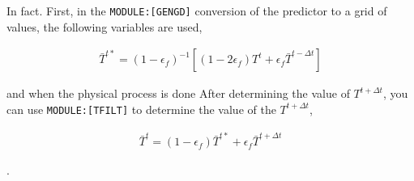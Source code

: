 In fact. First, in the \texttt{MODULE:{[}GENGD{]}} conversion of the
predictor to a grid of values, the following variables are used,

\begin{eqnarray}
  \bar{T}^{t*}
    = ( 1 -\epsilon_f )^{-1}
     \left[ ( 1-2 \epsilon_f ) T^{t} + \epsilon_f \bar{T}^{t-\Delta t}
     \right]
\end{eqnarray}

and when the physical process is done After determining the value of
\(T^{t+\Delta t}\), you can use \texttt{MODULE:{[}TFILT{]}} to determine
the value of the \(T^{t+\Delta t}\),

\begin{eqnarray}
 \bar{T}^{t}
    = ( 1 -\epsilon_f ) \bar{T}^{t*}  
       +  \epsilon_f \bar{T}^{t+\Delta t}
\end{eqnarray}

.
